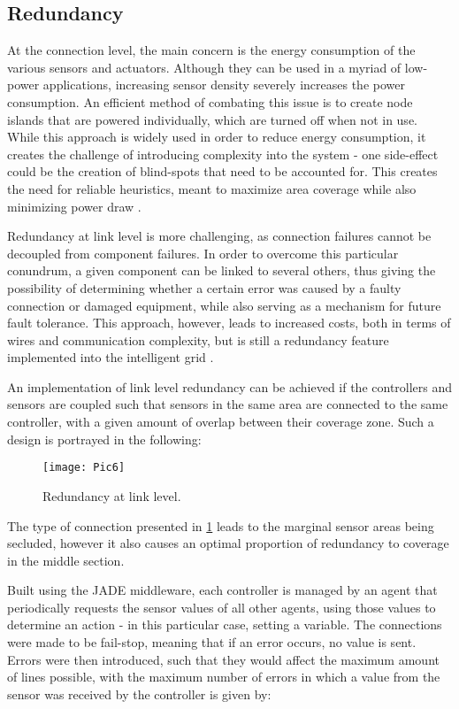 \subsection{Redundancy}

At the connection level, the main concern is the energy consumption of the various sensors and actuators. Although they can be used in a 
myriad of low-power applications, increasing sensor density severely increases the power consumption. An efficient method of combating this 
issue is to create node islands that are powered individually, which are turned off when not in use. While this approach is widely used in 
order to reduce energy consumption, it creates the challenge of introducing complexity into the system - one side-effect could be the creation 
of blind-spots that need to be accounted for. This creates the need for reliable heuristics, meant to maximize area coverage while also 
minimizing power draw \cite{4}.

Redundancy at link level is more challenging, as connection failures cannot be decoupled from component failures. In order to overcome this
particular conundrum, a given component can be linked to several others, thus giving the possibility of determining whether a certain
error was caused by a faulty connection or damaged equipment, while also serving as a mechanism for future fault tolerance. This approach,
however, leads to increased costs, both in terms of wires and communication complexity, but is still a redundancy feature implemented into
the intelligent grid \cite{46}.

An implementation of link level redundancy can be achieved if the controllers and sensors are coupled such that sensors in the same area
are connected to the same controller, with a given amount of overlap between their coverage zone.  Such a design is portrayed in the following:

\begin{figure}[H]
	\texttt{[image: Pic6]}
    \caption{Redundancy at link level. \cite{88} \label{fig:redundancy}}
\end{figure}

The type of connection presented in \cref{fig:redundancy} leads to the marginal sensor areas being secluded, however it also causes an 
optimal proportion of redundancy to coverage in the middle section.

Built using the JADE middleware, each controller is managed by an agent that periodically requests the sensor values of all other agents,
using those values to determine an action - in this particular case, setting a variable. The connections were made to be fail-stop, meaning
that if an error occurs, no value is sent. Errors were then introduced, such that they would affect the maximum amount of lines possible,
with the maximum number of errors in which a value from the sensor was received by the controller is given by:

